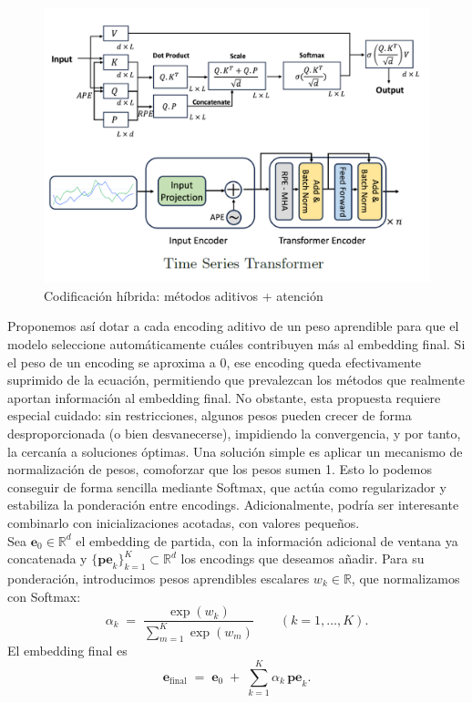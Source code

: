 \begin{figure}[!ht]
	\centering
	\includegraphics[scale=0.35]{img/hybridpaper.png}
	\caption{Codificación híbrida: métodos aditivos + atención \cite{irani2025positionalencodingtransformerbasedtime}}
	\label{hybridpaper}
\end{figure}


Proponemos así dotar a cada encoding aditivo de un peso aprendible para que el modelo seleccione automáticamente cuáles contribuyen más al embedding final. Si el peso de un encoding se aproxima a 0, ese encoding queda efectivamente suprimido de la ecuación, permitiendo que prevalezcan los métodos que realmente aportan información al embedding final. No obstante, esta propuesta requiere especial cuidado: sin restricciones, algunos pesos pueden crecer de forma desproporcionada (o bien desvanecerse), impidiendo la convergencia, y por tanto, la cercanía a soluciones óptimas. Una solución simple es aplicar un mecanismo de normalización de pesos, comoforzar que los pesos sumen 1. Esto lo podemos conseguir de forma sencilla mediante Softmax, que actúa como regularizador y estabiliza la ponderación entre encodings. Adicionalmente, podría ser interesante combinarlo con inicializaciones acotadas, con valores pequeños.\\

Sea \(\mathbf{e}_0\in\mathbb{R}^d\) el embedding de partida, con la información adicional de ventana ya concatenada y \(\{\mathbf{pe}_k\}_{k=1}^K \subset \mathbb{R}^d\) los encodings que deseamos añadir. Para su ponderación, introducimos pesos aprendibles escalares \(w_k\in\mathbb{R}\), que normalizamos con Softmax:
\[
\alpha_k \;=\; \frac{\exp(w_k)}{\sum_{m=1}^{K}\exp(w_m)} \qquad (k=1,\dots,K).
\]
El embedding final es
\[
\mathbf{e}_{\mathrm{final}} \;=\; \mathbf{e}_0 \;+\; \sum_{k=1}^{K} \alpha_k\,\mathbf{pe}_k.
\]


